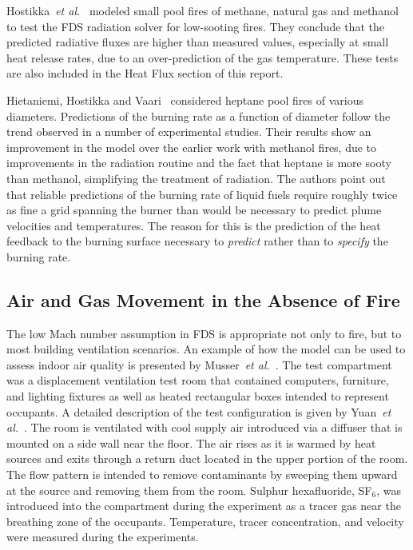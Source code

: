 Hostikka~{\em et al.}~\cite{Hostikka:3} modeled small pool fires of methane, natural gas and methanol to test the FDS radiation solver for low-sooting fires. They conclude that the predicted radiative fluxes are higher than measured values, especially at small heat release rates, due to an over-prediction of the gas temperature. These tests are also included in the Heat Flux section of this report.

Hietaniemi, Hostikka and Vaari~\cite{Hietaniemi:1} considered heptane pool fires of various diameters. Predictions of the burning rate as a function of diameter follow the trend observed in a number of experimental studies. Their results show an improvement in the model over the earlier work with methanol fires, due to improvements in the radiation routine and the fact that heptane is more sooty than methanol, simplifying the treatment of radiation.  The authors point out that reliable predictions of the burning rate of liquid fuels require roughly twice as fine a grid spanning the burner than would be necessary to predict plume velocities and temperatures. The reason for this is the prediction of the heat feedback to the burning surface necessary to {\em predict} rather than to {\em specify} the burning rate.


\subsection{Air and Gas Movement in the Absence of Fire}

The low Mach number assumption in FDS is appropriate not only to fire, but to most building ventilation scenarios. An example of how the model can be used to assess indoor air quality is presented by Musser~{\em et al.}~\cite{Musser:1}.  The test compartment was a displacement ventilation test  room  that contained  computers, furniture, and lighting fixtures as well as heated rectangular boxes intended to represent occupants. A detailed description of the test configuration is given by Yuan~{\em et al.}~\cite{Yuan:1}. The room is ventilated with cool supply air introduced via a diffuser that is mounted on a side wall near the floor. The air rises as it is warmed by heat sources and exits through a return duct located in the upper portion of the room. The  flow pattern is intended to remove contaminants by sweeping them upward at the source and removing them from the room. Sulphur hexafluoride, SF$_6$, was introduced into the compartment during the experiment as a tracer gas near the breathing zone of the  occupants.  Temperature, tracer concentration, and velocity were measured during the experiments.


